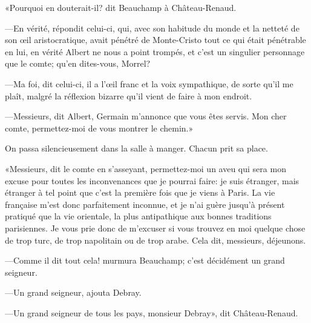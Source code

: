 «Pourquoi en douterait-il? dit Beauchamp à Château-Renaud. 

—En vérité, répondit celui-ci, qui, avec son habitude du monde et la netteté de son œil aristocratique, avait pénétré de Monte-Cristo tout ce qui était pénétrable en lui, en vérité Albert ne nous a point trompés, et c'est un singulier personnage que le comte; qu'en dites-vous, Morrel? 

—Ma foi, dit celui-ci, il a l'œil franc et la voix sympathique, de sorte qu'il me plaît, malgré la réflexion bizarre qu'il vient de faire à mon endroit.  

—Messieurs, dit Albert, Germain m'annonce que vous êtes servis. Mon cher comte, permettez-moi de vous montrer le chemin.» 

On passa silencieusement dans la salle à manger. Chacun prit sa place. 

«Messieurs, dit le comte en s'asseyant, permettez-moi un aveu qui sera mon excuse pour toutes les inconvenances que je pourrai faire: je suis étranger, mais étranger à tel point que c'est la première fois que je viens à Paris. La vie française m'est donc parfaitement inconnue, et je n'ai guère jusqu'à présent pratiqué que la vie orientale, la plus antipathique aux bonnes traditions parisiennes. Je vous prie donc de m'excuser si vous trouvez en moi quelque chose de trop turc, de trop napolitain ou de trop arabe. Cela dit, messieurs, déjeunons. 

—Comme il dit tout cela! murmura Beauchamp; c'est décidément un grand seigneur. 

—Un grand seigneur, ajouta Debray. 

—Un grand seigneur de tous les pays, monsieur Debray», dit Château-Renaud. 